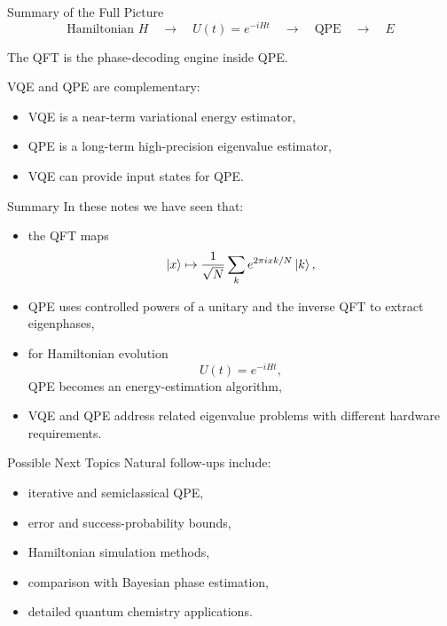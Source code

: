 \documentclass{beamer}
\begin{document}
\begin{frame}{Summary of the Full Picture}
\[
\text{Hamiltonian } H
\quad \longrightarrow \quad
U(t)=e^{-iHt}
\quad \longrightarrow \quad
\text{QPE}
\quad \longrightarrow \quad
E
\]

The QFT is the phase-decoding engine inside QPE.

VQE and QPE are complementary:
\begin{itemize}
\item VQE is a near-term variational energy estimator,
\item QPE is a long-term high-precision eigenvalue estimator,
\item VQE can provide input states for QPE.
\end{itemize}
\end{frame}

\begin{frame}{Summary}
In these notes we have seen that:
\begin{itemize}
\item the QFT maps
\[
\ket{x}\mapsto \frac{1}{\sqrt N}\sum_k e^{2\pi i xk/N}\ket{k},
\]
\item QPE uses controlled powers of a unitary and the inverse QFT to extract eigenphases,
\item for Hamiltonian evolution
\[
U(t)=e^{-iHt},
\]
QPE becomes an energy-estimation algorithm,
\item VQE and QPE address related eigenvalue problems with different hardware requirements.
\end{itemize}
\end{frame}

\begin{frame}{Possible Next Topics}
Natural follow-ups include:
\begin{itemize}
\item iterative and semiclassical QPE,
\item error and success-probability bounds,
\item Hamiltonian simulation methods,
\item comparison with Bayesian phase estimation,
\item detailed quantum chemistry applications.
\end{itemize}
\end{frame}
\end{document}
